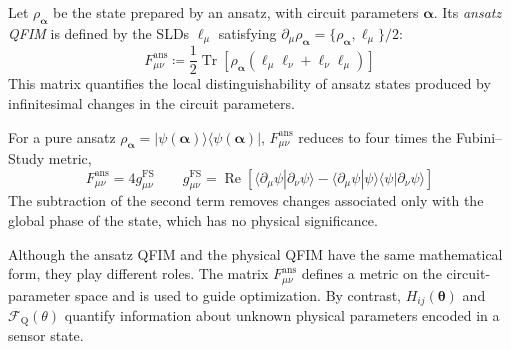 \begin{definition}
    Let $\rho_{\boldsymbol{\alpha}}$ be the state prepared by an ansatz, with circuit parameters $\boldsymbol{\alpha}$. Its \emph{ansatz QFIM} is defined by the SLDs $\ell_\mu$ satisfying $\partial_\mu\rho_{\boldsymbol{\alpha}}=\{\rho_{\boldsymbol{\alpha}},\ell_\mu\}/2$:
    \begin{equation}
        F^{\mathrm{ans}}_{\mu\nu}
        \coloneqq
        \frac{1}{2}
        \operatorname{Tr}
        \left[
            \rho_{\boldsymbol{\alpha}}
            \left(
            \ell_\mu\ell_\nu
            +
            \ell_\nu\ell_\mu
            \right)
            \right]
        \label{eq:ansatz_qfim}
    \end{equation}
    This matrix quantifies the local distinguishability of ansatz states produced by infinitesimal changes in the circuit parameters.

    For a pure ansatz $\rho_{\boldsymbol{\alpha}}=|\psi(\boldsymbol{\alpha})\rangle\langle\psi(\boldsymbol{\alpha})|$, $F^{\mathrm{ans}}_{\mu\nu}$ reduces to four times the Fubini--Study metric,
    \begin{equation}
        F^{\mathrm{ans}}_{\mu\nu}=4g^{\mathrm{FS}}_{\mu\nu}
        \qquad
        g^{\mathrm{FS}}_{\mu\nu}
        =\operatorname{Re}\!\left[
            \langle\partial_\mu\psi|\partial_\nu\psi\rangle
            -\langle\partial_\mu\psi|\psi\rangle
            \langle\psi|\partial_\nu\psi\rangle\right]
        \label{eq:fubini_study_def}
    \end{equation}
    The subtraction of the second term removes changes associated only with the global phase of the state, which has no physical significance.

    Although the ansatz QFIM and the physical QFIM have the same mathematical form, they play different roles. The matrix $F^{\mathrm{ans}}_{\mu\nu}$ defines a metric on the circuit-parameter space and is used to guide optimization. By contrast, $H_{ij}(\boldsymbol{\theta})$ and $\mathcal{F}_{\mathrm Q}(\theta)$ quantify information about unknown physical parameters encoded in a sensor state.
\end{definition}

